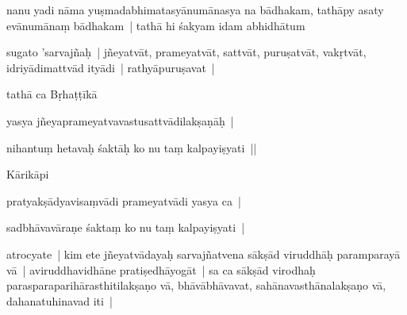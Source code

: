 \documentclass[article,12pt,a4paper]{memoir}%
\newcounter{parCount}
\begin{document}
	  
	  \pstart \leavevmode%
	\label{thakur75-23.9}nanu yadi nāma yuṣmadabhimatasyānumānasya na bādhakam, tathāpy asaty evānumānaṃ bādhakam | tathā hi śakyam idam abhidhātum 
	{}
	\pend%
      

	  
	  \pstart \leavevmode%
	sugato 'sarvajñaḥ | jñeyatvāt, prameyatvāt, sattvāt, puruṣatvāt, vakṛtvāt, idriyādimattvād ityādi | rathyāpuruṣavat | 
	{}
	\pend%
      

	  
	  \pstart \leavevmode%
	tathā ca Bṛhaṭṭīkā 
	{}
	\pend%
      

	  
	  \pstart \leavevmode%
	yasya jñeyaprameyatvavastusattvādilakṣaṇāḥ | 
	{}
	\pend%
      

	  
	  \pstart \leavevmode%
	nihantuṃ hetavaḥ śaktāḥ ko nu taṃ kalpayiṣyati || 
	{}
	\pend%
      

	  
	  \pstart \leavevmode%
	Kārikāpi 
	{}
	\pend%
      

	  
	  \pstart \leavevmode%
	pratyakṣādyavisaṃvādi prameyatvādi yasya ca | 
	{}
	\pend%
      

	  
	  \pstart \leavevmode%
	sadbhāvavāraṇe śaktaṃ ko nu taṃ kalpayiṣyati | 
	{}
	\pend%
      

	  
	  \pstart \leavevmode%
	\label{thakur75-23.21}atrocyate | kim ete jñeyatvādayaḥ sarvajñatvena sākṣād viruddhāḥ paramparayā vā | aviruddhavidhāne pratiṣedhāyogāt | sa ca sākṣād virodhaḥ parasparaparihārasthitilakṣaṇo vā, bhāvābhāvavat, sahānavasthānalakṣaṇo vā, dahanatuhinavad iti | 
	{}
	\pend%
      
\end{document}
